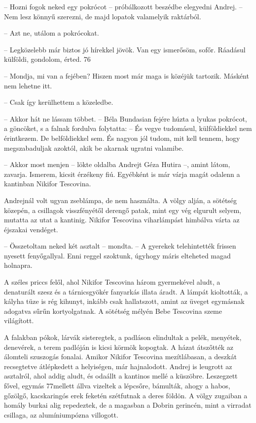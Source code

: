 \documentclass{IEEEtran}
\begin{document}
– Hozni fogok neked egy pokrócot – próbálkozott beszédbe elegyedni Andrej. –
Nem lesz könnyű szerezni, de majd lopatok valamelyik raktárból.

– Azt ne, utálom a pokrócokat.

– Legközelebb már biztos jó hírekkel jövök. Van egy ismerősöm, sofőr. Ráadásul
külföldi, gondolom, érted.
76

– Mondja, mi van a fejében? Hiszen most már maga is közéjük tartozik. Másként
nem lehetne itt.

– Csak így kerülhettem a közeledbe.

– Akkor hát ne lássam többet. – Béla Bundasian fejére húzta a lyukas pokrócot,
a göncöket, s a falnak fordulva folytatta: – És vegye tudomásul, külföldiekkel
nem érintkezem. De belföldiekkel sem. És nagyon jól tudom, mit kell tennem,
hogy megszabaduljak azoktól, akik be akarnak ugratni valamibe.

– Akkor most menjen – lökte oldalba Andrejt Géza Hutira –, amint látom,
zavarja. Ismerem, kicsit érzékeny fiú. Egyébként is már várja magát odalenn a
kantinban Nikifor Tescovina.

Andrejnál volt ugyan zseblámpa, de nem használta. A völgy alján, a sötétség
közepén, a csillagok visszfényétől derengő patak, mint egy vég elgurult
selyem, mutatta az utat a kantinig. Nikifor Tescovina viharlámpást himbálva
várta az éjszakai vendéget.

– Összetoltam neked két asztalt – mondta. – A gyerekek telehintették frissen
nyesett fenyőgallyal. Enni reggel szoktunk, úgyhogy máris elteheted magad
holnapra.

A széles priccs felől, ahol Nikifor Tescovina három gyermekével aludt, a
denaturált szesz és a tárnicsgyökér fanyarkás illata áradt. A lámpát
kioltották, a kályha tüze is rég kihunyt, inkább csak hallatszott, amint az
üveget egymásnak adogatva sűrűn kortyolgatnak. A sötétség mélyén Bebe
Tescovina szeme világított.

A falakban pókok, lárvák sisteregtek, a padláson elindultak a pelék, menyétek,
denevérek, a terem padlóján is kicsi körmök kopogtak. A házat átszőtték az
álomteli szuszogás fonalai. Amikor Nikifor Tescovina mezítlábasan, a deszkát
recsegtetve átlépkedett a helyiségen, már hajnalodott. Andrej is leugrott az
asztalról, ahol addig aludt, és odaállt a kantinos mellé a küszöbre.
Leszegzett fővel, egymás 77mellett állva vizeltek a lépcsőre, bámulták, ahogy
a habos, gőzölgő, kacskaringós erek feketén szétfutnak a deres földön. A völgy
zugaiban a homály burkai alig repedeztek, de a magasban a Dobrin gerincén,
mint a virradat csillaga, az alumíniumpózna villogott.
\end{document}
